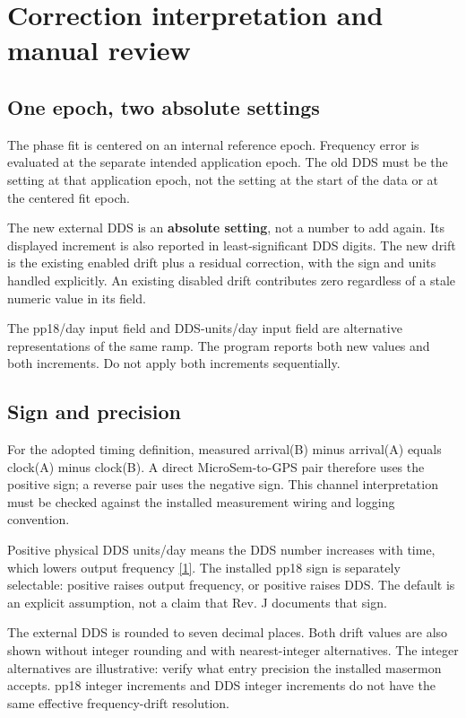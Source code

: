 \documentclass[11pt,a4paper]{article}
\newcommand{\manual}{\href{https://www.gb.nrao.edu/~fghigo/timer/MSMmaser/Maser_UG_75666-201_Rev_J.PDF}{[1]}}
\begin{document}
\section{Correction interpretation and manual review}
\subsection{One epoch, two absolute settings}
The phase fit is centered on an internal reference epoch. Frequency error is
evaluated at the separate intended application epoch. The old DDS must be the
setting at that application epoch, not the setting at the start of the data
or at the centered fit epoch.

The new external DDS is an \textbf{absolute setting}, not a number to add
again. Its displayed increment is also reported in least-significant DDS
digits. The new drift is the existing enabled drift plus a residual correction,
with the sign and units handled explicitly. An existing disabled drift
contributes zero regardless of a stale numeric value in its field.

The pp18/day input field and DDS-units/day input field are alternative
representations of the same ramp. The program reports both new values and
both increments. Do not apply both increments sequentially.

\subsection{Sign and precision}
For the adopted timing definition, measured arrival(B) minus arrival(A)
equals clock(A) minus clock(B). A direct MicroSem-to-GPS pair therefore uses
the positive sign; a reverse pair uses the negative sign. This channel
interpretation must be checked against the installed measurement wiring and
logging convention.

Positive physical DDS units/day means the DDS number increases with time,
which lowers output frequency \manual. The installed pp18 sign is separately
selectable: positive raises output frequency, or positive raises DDS. The
default is an explicit assumption, not a claim that Rev. J documents that sign.

The external DDS is rounded to seven decimal places. Both drift values are
also shown without integer rounding and with nearest-integer alternatives.
The integer alternatives are illustrative: verify what entry precision the
installed masermon accepts. pp18 integer increments and DDS integer increments
do not have the same effective frequency-drift resolution.
\end{document}
